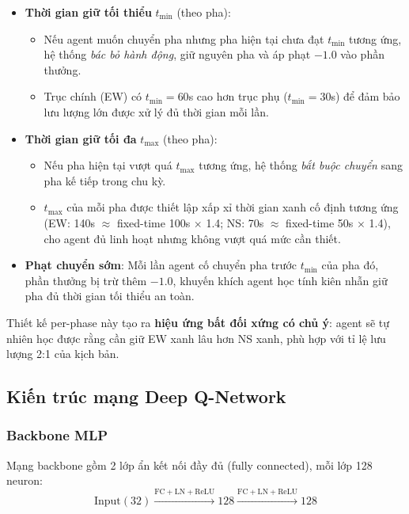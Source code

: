 \begin{itemize}
    \item \textbf{Thời gian giữ tối thiểu} $t_{\min}$ (theo pha):
    \begin{itemize}
        \item Nếu agent muốn chuyển pha nhưng pha hiện tại chưa đạt $t_{\min}$ tương ứng, hệ thống \textit{bác bỏ hành động}, giữ nguyên pha và áp phạt $-1.0$ vào phần thưởng.
        \item Trục chính (EW) có $t_{\min} = 60$s cao hơn trục phụ ($t_{\min} = 30$s) để đảm bảo lưu lượng lớn được xử lý đủ thời gian mỗi lần.
    \end{itemize}

    \item \textbf{Thời gian giữ tối đa} $t_{\max}$ (theo pha):
    \begin{itemize}
        \item Nếu pha hiện tại vượt quá $t_{\max}$ tương ứng, hệ thống \textit{bắt buộc chuyển} sang pha kế tiếp trong chu kỳ.
        \item $t_{\max}$ của mỗi pha được thiết lập xấp xỉ thời gian xanh cố định tương ứng (EW: 140s $\approx$ fixed-time 100s $\times$ 1.4; NS: 70s $\approx$ fixed-time 50s $\times$ 1.4), cho agent đủ linh hoạt nhưng không vượt quá mức cần thiết.
    \end{itemize}

    \item \textbf{Phạt chuyển sớm}: Mỗi lần agent cố chuyển pha trước $t_{\min}$ của pha đó, phần thưởng bị trừ thêm $-1.0$, khuyến khích agent học tính kiên nhẫn giữ pha đủ thời gian tối thiểu an toàn.
\end{itemize}

\vspace{6pt}
Thiết kế per-phase này tạo ra \textbf{hiệu ứng bất đối xứng có chủ ý}: agent sẽ tự nhiên học được rằng cần giữ EW xanh lâu hơn NS xanh, phù hợp với tỉ lệ lưu lượng 2:1 của kịch bản.

\subsection{Kiến trúc mạng Deep Q-Network}

\subsubsection{Backbone MLP}

Mạng backbone gồm 2 lớp ẩn kết nối đầy đủ (fully connected), mỗi lớp 128 neuron:
\[
\text{Input}(32) \xrightarrow{\text{FC}+\text{LN}+\text{ReLU}} 128 \xrightarrow{\text{FC}+\text{LN}+\text{ReLU}} 128
\]

